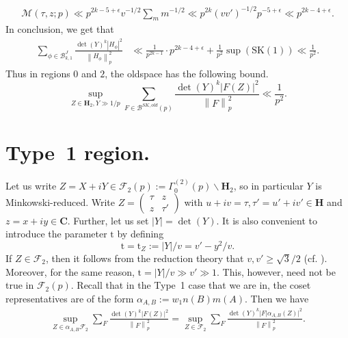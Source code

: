 \documentclass[11pt]{amsart}
\numberwithin{equation}{section}
\theoremstyle{plain}
\theoremstyle{definition}
\newcommand{\mf}{\mathbf}
\newcommand{\mc}{\mathcal}
\newcommand{\mrm}{\mathrm}
\newcommand*{\norm}[1]{\left\lVert#1\right\rVert}
\newcommand{\sumn}{\sum \nolimits}
\newcommand{\smat}[4]{\left( \begin{smallmatrix}#1&#2\\#3&#4\end{smallmatrix}\right)}
\newcommand{\fp}{\mc F_2(p)}
\newcommand{\tz}{{\mrm t}_Z}
\begin{document}
\begin{align}
    \mc M(\tau,z;p) \ll p^{2k-5+\epsilon}v^{-1/2}\sumn_m m^{-1/2}\ll p^{2k}(vv')^{-1/2} p^{-5+\epsilon} \ll p^{2k-4+\epsilon}.
\end{align}
In conclusion, we get that
\begin{align}
    \sum_{\phi\in \mc B_{k,1}^J}\frac{\det(Y)^k |H_{\phi}|^2}{\norm{H_{\phi}}^2_p} &\ll \frac{1}{p^{2k-1}}\cdot p^{2k-4+\epsilon}+\frac{1}{p^2}\sup(\mrm{SK}(1))\ll \frac{1}{p^2}.
\end{align}
Thus in regions 0 and $2$, the oldspace has the following bound.
\begin{equation}
   \sup_{Z\in \mf H_2, Y\gg 1/p} \sum_{F\in \mc B^{SK, old}(p)}\frac{\det(Y)^k|F(Z)|^2}{\norm{F}^2_p}\ll \frac{1}{p^{2}}.
\end{equation}
\section{Type~1 region.}\label{avgtype1}
Let us write $Z=X+iY \in \mc F_2(p) :=\Gamma_0^{(2)}(p) \backslash \mf H_2$, so in particular $Y$ is Minkowski-reduced. Write
$  Z = \smat{\tau}{z}{z}{\tau'}$
with $u+iv=\tau, \tau'=u'+iv' \in \mf H$ and $z=x+iy \in \mf C$. Further, let us set $|Y| = \det(Y)$. It is also convenient to introduce the parameter $\mrm t$ by defining
\begin{equation}
{\mrm t} = \tz := |Y|/v = v'-y^2/v.
\end{equation}
If $Z \in \mc F_2$, then it follows from the reduction theory that $v,v' \geq \sqrt{3}/2$ (cf. \cite{Fr}). Moreover, for the same reason, ${\mrm t} = |Y|/v \gg v' \gg 1$. This, however, need not be true in $\fp$. Recall that in the Type~1 case that we are in, the coset representatives are of the form $\alpha_{A, B}:=w_1 n(B)m(A)$. Then we have 
\begin{align} \label{type2-1}
    \sup_{ Z \in {\alpha_{A,B} \mc F_2} } \sum_{F}\frac{\det(Y)^{k} |F(Z)|^2}{\norm{F}^2_p}= \sup_{Z \in \mc F_2}\sum_F  \frac{\det(Y)^{k} |F | \alpha_{A,B}(Z)|^2}{\norm{F}^2_p} .
 \end{align}
 
\end{document}
